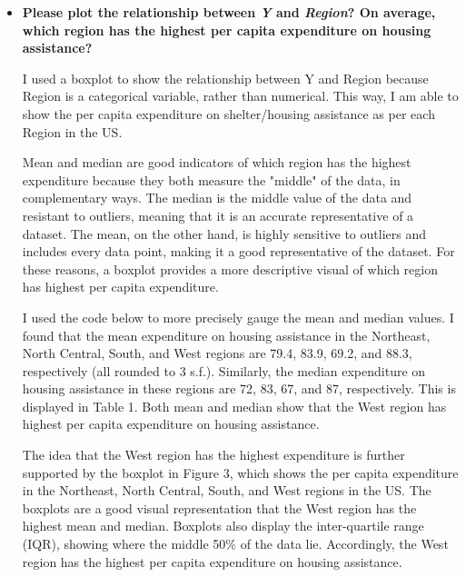\documentclass[12pt,letterpaper]{article}
\begin{document}
\begin{itemize}
\textbf{Plot 6: "Financial insecurity vs Urban residents"}
This plot shows the number of residents per 100,000 that are "financially insecure" in a state and the number of of people per thousand residing in urban areas in a state. There is a very weak positive correlation, where r=0.22. This indicates that with more urban residents per thousand in a state, financial insecurity tends to be higher.
\vspace{0.5 cm}

\item
\textbf{Please plot the relationship between \emph{Y} and \emph{Region}? On average, which region has the highest per capita expenditure on housing assistance?}
\vspace{0cm}

I used a boxplot to show the relationship between Y and Region because Region is a categorical variable, rather than numerical. This way, I am able to show the per capita expenditure on shelter/housing assistance as per each Region in the US.



Mean and median are good indicators of which region has the highest expenditure because they both measure the "middle" of the data, in complementary ways. The median is the middle value of the data and resistant to outliers, meaning that it is an accurate representative of a dataset. The mean, on the other hand, is highly sensitive to outliers and includes every data point, making it a good representative of the dataset. For these reasons, a boxplot provides a more descriptive visual of which region has highest per capita expenditure.

I used the code below to more precisely gauge the mean and median values. I found that the mean expenditure on housing assistance in the Northeast, North Central, South, and West regions are 79.4, 83.9, 69.2, and 88.3, respectively (all rounded to 3 s.f.). Similarly, the median expenditure on housing assistance in these regions are 72, 83, 67, and 87, respectively. This is displayed in Table 1. Both mean and median show that the West region has highest per capita expenditure on housing assistance.




\vspace{1.2 cm}

The idea that the West region has the highest expenditure is further supported by the boxplot in Figure 3, which shows the per capita expenditure in the Northeast, North Central, South, and West regions in the US. The boxplots are a good visual representation that the West region has the highest mean and median. Boxplots also display the inter-quartile range (IQR), showing where the middle 50\% of the data lie. Accordingly, the West region has the highest per capita expenditure on housing assistance.


\end{itemize}
\end{document}
